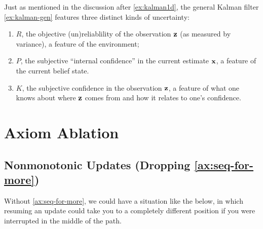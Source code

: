 \begin{subappendices}
    Just as mentioned in the discussion after \cref{ex:kalman1d}, 
    the general Kalman filter \cref{ex:kalman-gen} features
    three distinct kinds of uncertainty:
    \begin{enumerate}
    	\item $R$, the objective (un)reliablility of the observation $\mathbf z$
    		(as measured by variance), a feature of the environment;
    	\item $P$, the subjective ``internal confidence'' in the current
    	 	estimate $\mathbf x$, a feature of the current belief state.
    	\item $K$, the subjective confidence in the observation $\mathbf z$,
    		a feature of what one knows about where $\mathbf z$ comes from and
    		how it relates to one's confidence.
    \end{enumerate}


    \section{Axiom Ablation}
    	\label{sec:axiom-ablation}

    \subsection{Nonmonotonic Updates (Dropping \ref{ax:seq-for-more})}
    Without \cref{ax:seq-for-more}, we could have a situation like the below,
    in which resuming an update could take you to a completely different position
    if you were interrupted in the middle of the path. 


\end{subappendices}
